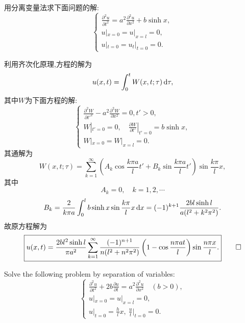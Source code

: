\begin{exercise}
  用分离变量法求下面问题的解:
  \[\begin{cases}
    \frac{\partial^2u}{\partial t^2} = a^2 \frac{\partial^2u}{\partial x^2} + b\sinh x, \\
    u|_{x=0} = u|_{x=l} = 0, \\
    u|_{t=0} = u_t|_{t=0} = 0.
  \end{cases}\]
\end{exercise}

\begin{solve}
  利用齐次化原理,方程的解为
  \[u(x,t)=\int_0^tW(x,t;\tau)\mathop{}\!\mathrm{d}\tau,\]
  其中$W$为下面方程的解:
  \[\begin{cases}
    \frac{\partial^2W}{\partial t'^2}-a^2\frac{\partial^2W}{\partial x^2}=0,t'>0, \\
    W|_{t'=0} = 0,\quad\frac{\partial W}{\partial t'}|_{t'=0} = b\sinh x, \\
    W|_{x=0} = W|_{x=l} = 0.
  \end{cases}\]
  其通解为
  \[W(x,t;\tau) = \sum_{k=1}^{\infty}\left(A_k\cos\frac{k\pi a}{l}t'
    + B_k\sin\frac{k\pi a}{l}t'\right)\sin\frac{k\pi}{l}x,\]
  其中
  \[A_k = 0,\quad k=1,2,\cdots\]
  \[B_k = \frac{2}{k\pi a}\int_0^l b\sinh x\sin\frac{k\pi}{l}x\mathop{}\!\mathrm{d} x
    = (-1)^{k+1}\frac{2bl\sinh l}{a(l^2+k^2\pi^2)}.\]
  故原方程解为
  \[ \boxed{u(x,t) = \frac{2bl^2\sinh l}{\pi a^2}
      \sum_{k=1}^{\infty}\frac{(-1)^{n+1}}{n(l^2+n^2\pi^2)}
      \left(1-\cos\frac{n\pi at}{l}\right)\sin\frac{n\pi x}{l}.}\qedhere \]
\end{solve}


\begin{exercise}
  Solve the following problem by separation of variables:
  \[\begin{cases}
    \frac{\partial^2 u}{\partial t^2} + 2b \frac{\partial u}{\partial t}
      = a^2 \frac{\partial^2u}{\partial x^2} \quad (b>0), \\
    u|_{x=0} = u|_{x=l} = 0, \\
    u|_{t=0} = \frac{h}{l}x,\ \frac{u}{t}\big|_{t=0} = 0.
  \end{cases}\]
\end{exercise}

